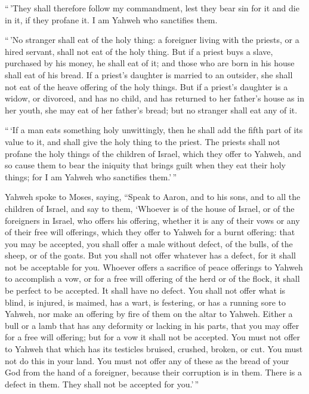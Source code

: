  ``\,'They shall therefore follow my commandment, lest
they bear sin for it and die in it, if they profane it. I am Yahweh who
sanctifies them.

 ``\,'No stranger shall eat of the holy thing: a
foreigner living with the priests, or a hired servant, shall not eat of
the holy thing.  But if a priest buys a slave, purchased
by his money, he shall eat of it; and those who are born in his house
shall eat of his bread.  If a priest's daughter is
married to an outsider, she shall not eat of the heave offering of the
holy things.  But if a priest's daughter is a widow, or
divorced, and has no child, and has returned to her father's house as in
her youth, she may eat of her father's bread; but no stranger shall eat
any of it.

 ``\,`If a man eats something holy unwittingly, then he
shall add the fifth part of its value to it, and shall give the holy
thing to the priest.  The priests shall not profane the
holy things of the children of Israel, which they offer to Yahweh,
 and so cause them to bear the iniquity that brings guilt
when they eat their holy things; for I am Yahweh who sanctifies
them.'\,''

 Yahweh spoke to Moses, saying,  ``Speak
to Aaron, and to his sons, and to all the children of Israel, and say to
them, `Whoever is of the house of Israel, or of the foreigners in
Israel, who offers his offering, whether it is any of their vows or any
of their free will offerings, which they offer to Yahweh for a burnt
offering:  that you may be accepted, you shall offer a
male without defect, of the bulls, of the sheep, or of the goats.
 But you shall not offer whatever has a defect, for it
shall not be acceptable for you.  Whoever offers a
sacrifice of peace offerings to Yahweh to accomplish a vow, or for a
free will offering of the herd or of the flock, it shall be perfect to
be accepted. It shall have no defect.  You shall not
offer what is blind, is injured, is maimed, has a wart, is festering, or
has a running sore to Yahweh, nor make an offering by fire of them on
the altar to Yahweh.  Either a bull or a lamb that has
any deformity or lacking in his parts, that you may offer for a free
will offering; but for a vow it shall not be accepted. 
You must not offer to Yahweh that which has its testicles bruised,
crushed, broken, or cut. You must not do this in your land.
 You must not offer any of these as the bread of your God
from the hand of a foreigner, because their corruption is in them. There
is a defect in them. They shall not be accepted for you.'\,''

